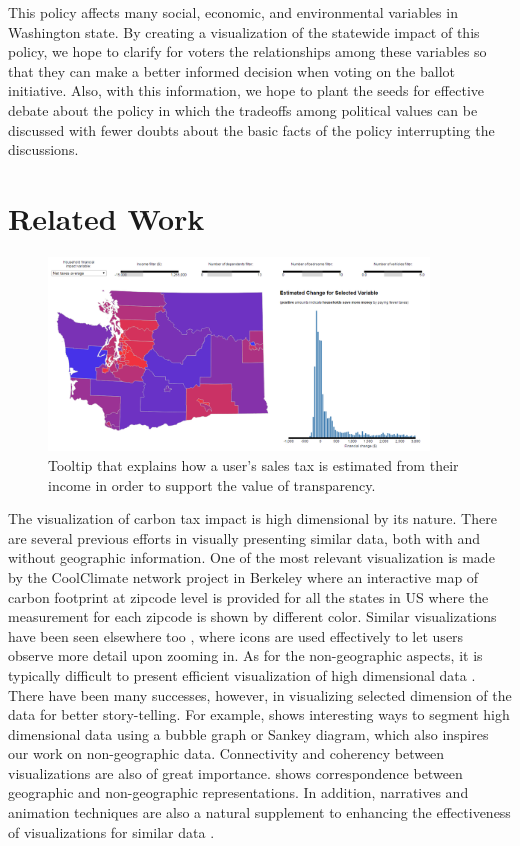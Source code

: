 \documentclass{sigchi}
\begin{document}
This policy affects many social, economic, and environmental variables in Washington state. By creating a visualization of the statewide impact of this policy, we hope to clarify for voters the relationships among these variables so that they can make a better informed decision when voting on the ballot initiative. Also, with this information, we hope to plant the seeds for effective debate about the policy in which the tradeoffs among political values can be discussed with fewer doubts about the basic facts of the policy interrupting the discussions.

\section{Related Work}
\begin{figure}[t]
\centering
\includegraphics[width=0.9\textwidth]{summary}
\caption{Tooltip that explains how a user's sales tax is estimated from their income in order to support the value of transparency.}
\label{fig:summary}
\end{figure}
The visualization of carbon tax impact is high dimensional by its nature. There are several previous efforts in visually presenting similar data, both with and without geographic information. One of the most relevant visualization is made by the CoolClimate network project in Berkeley\cite{coolclimate} where an interactive map of carbon footprint at zipcode level is provided for all the states in US where the measurement for each zipcode is shown by different color. Similar visualizations have been seen elsewhere too \cite{almanac, powerplant}, where icons are used effectively to let users observe more detail upon zooming in. As for the non-geographic aspects, it is typically difficult to present efficient visualization of high dimensional data \cite{seo2005rank}. There have been many successes, however, in visualizing selected dimension of the data for better story-telling. For example, \cite{nytimes} shows interesting ways to segment high dimensional data using a bubble graph or Sankey diagram, which also inspires our work on non-geographic data. Connectivity and coherency between visualizations are also of great importance. \cite{nytimes-map} shows correspondence between geographic and non-geographic representations. In addition, narratives and animation techniques are also a natural supplement to enhancing the effectiveness of visualizations for similar data \cite{jheer-animation, jheer-narrative}. 
\end{document}
